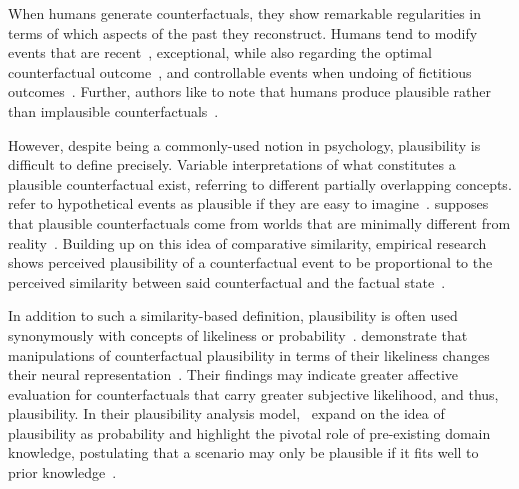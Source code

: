 When humans generate counterfactuals, they show remarkable regularities in terms of which aspects of the past they reconstruct. 
Humans tend to modify events that are recent~\citep{miller_temporal_1990, byrne_temporality_2000}, exceptional, while also regarding the optimal counterfactual outcome~\citep{kahneman_simulation_1982, dixon_if_2011}, and 
controllable events when undoing of fictitious outcomes~\citep{girotto_event_1991}.
Further, authors like to note that humans produce plausible rather than implausible counterfactuals~\citep{byrne_counterfactual_2016, de_brigard_coming_2013}.

However, despite being a commonly-used notion in psychology, plausibility is difficult to define precisely.
Variable interpretations of what constitutes a plausible counterfactual exist, referring to different partially overlapping concepts.
\citeauthor{kahneman_simulation_1982} refer to hypothetical events as plausible if they are easy to imagine~\citep{kahneman_simulation_1982}. 
\citeauthor{lewis_counterfactuals_1973} supposes that plausible counterfactuals come from worlds that are minimally different from reality~\citep{lewis_counterfactuals_1973}. 
Building up on this idea of comparative similarity, empirical research shows perceived plausibility of a counterfactual event to be proportional to the perceived similarity between said counterfactual and the factual state~\citep{stanley_counterfactual_2017, de_brigard_perceived_2021}.

In addition to such a similarity-based definition, plausibility is often used synonymously with concepts of likeliness or probability~\citep{pezdek_is_2006, de_brigard_remembering_2013}. 
\citeauthor{de_brigard_remembering_2013} demonstrate that manipulations of counterfactual plausibility in terms of their likeliness changes their neural representation~\citep{de_brigard_remembering_2013}.
Their findings may indicate greater affective evaluation for counterfactuals that carry greater subjective likelihood, and thus, plausibility.
In their plausibility analysis model,~\citeauthor{connell_model_2006} expand on the idea of plausibility as probability and highlight the pivotal role of pre-existing domain knowledge, postulating that a scenario may only be plausible if it fits well to prior knowledge~\citep{connell_model_2006}.

